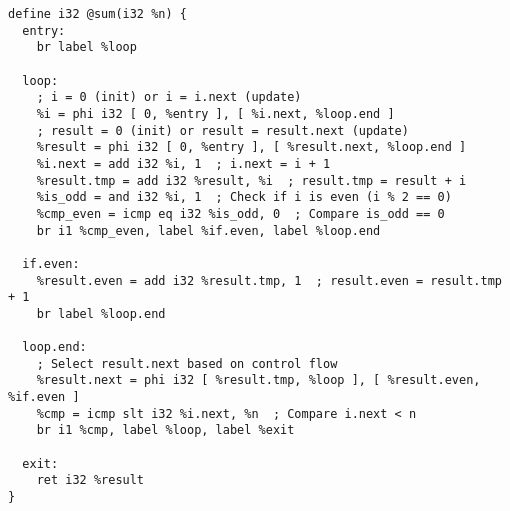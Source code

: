 \begin{lstlisting}[language=none]
define i32 @sum(i32 %n) {
  entry:
    br label %loop

  loop:
    ; i = 0 (init) or i = i.next (update)
    %i = phi i32 [ 0, %entry ], [ %i.next, %loop.end ]
    ; result = 0 (init) or result = result.next (update)
    %result = phi i32 [ 0, %entry ], [ %result.next, %loop.end ]
    %i.next = add i32 %i, 1  ; i.next = i + 1
    %result.tmp = add i32 %result, %i  ; result.tmp = result + i
    %is_odd = and i32 %i, 1  ; Check if i is even (i % 2 == 0)
    %cmp_even = icmp eq i32 %is_odd, 0  ; Compare is_odd == 0
    br i1 %cmp_even, label %if.even, label %loop.end

  if.even:
    %result.even = add i32 %result.tmp, 1  ; result.even = result.tmp + 1
    br label %loop.end

  loop.end:
    ; Select result.next based on control flow
    %result.next = phi i32 [ %result.tmp, %loop ], [ %result.even, %if.even ]
    %cmp = icmp slt i32 %i.next, %n  ; Compare i.next < n
    br i1 %cmp, label %loop, label %exit

  exit:
    ret i32 %result
}
\end{lstlisting}
